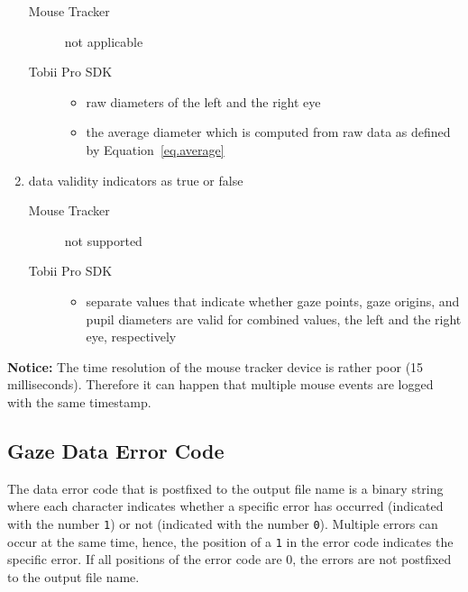 \documentclass[a4paper,oneside]{book}
\begin{document}
\begin{enumerate}
\begin{description}
            \item[Mouse Tracker] not applicable
            \item[Tobii Pro SDK] \hfill
                \begin{itemize}
                    \item raw diameters of the left and the right eye
                    \item the average diameter which is computed from raw data as defined by Equation~\ref{eq.average}
                \end{itemize}
        \end{description}
    \item data validity indicators as true or false
        \begin{description}
            \item[Mouse Tracker] not supported
            \item[Tobii Pro SDK] \hfill
                \begin{itemize}
                    \item separate values that indicate whether gaze points, gaze origins, and pupil diameters are valid for combined values, the left and the right eye, respectively
                \end{itemize}
        \end{description}
\end{enumerate}

\begin{mdframed}[backgroundcolor=boxbkg]\textbf{\color{orange}Notice:}
    The time resolution of the mouse tracker device is rather poor (15 milliseconds).
    Therefore it can happen that multiple mouse events are logged with the same timestamp.
\end{mdframed}

\subsection{Gaze Data Error Code}
\label{sect.data.error}
The data error code that is postfixed to the output file name is a binary string where each character indicates whether a specific error has occurred (indicated with the number \texttt{1}) or not (indicated with the number \texttt{0}).
Multiple errors can occur at the same time, hence, the position of a \texttt{1} in the error code indicates the specific error.
If all positions of the error code are 0, the errors are not postfixed to the output file name.
\end{document}
